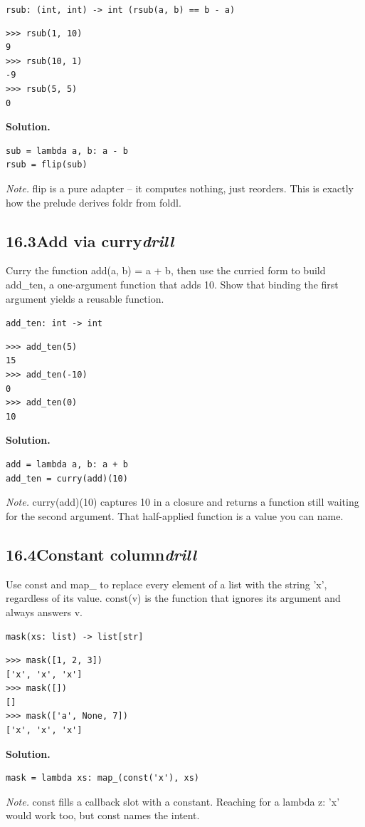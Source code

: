 \documentclass[10pt,letterpaper]{book}
\begin{document}
\noindent\texttt{rsub: (int, int) -> int   (rsub(a, b) == b - a)}
\begin{lstlisting}[style=ex]
>>> rsub(1, 10)
9
>>> rsub(10, 1)
-9
>>> rsub(5, 5)
0
\end{lstlisting}
\noindent\textbf{Solution.}
\begin{lstlisting}[style=code]
sub = lambda a, b: a - b
rsub = flip(sub)
\end{lstlisting}
\noindent\textit{Note.} flip is a pure adapter -- it computes nothing, just reorders. This is exactly how the prelude derives foldr from foldl.

\subsection*{16.3\quad Add via curry\hfill\textnormal{\textit{drill}}}
Curry the function add(a, b) = a + b, then use the curried form to build add\_ten, a one-argument function that adds 10. Show that binding the first argument yields a reusable function.

\noindent\texttt{add\_ten: int -> int}
\begin{lstlisting}[style=ex]
>>> add_ten(5)
15
>>> add_ten(-10)
0
>>> add_ten(0)
10
\end{lstlisting}
\noindent\textbf{Solution.}
\begin{lstlisting}[style=code]
add = lambda a, b: a + b
add_ten = curry(add)(10)
\end{lstlisting}
\noindent\textit{Note.} curry(add)(10) captures 10 in a closure and returns a function still waiting for the second argument. That half-applied function is a value you can name.

\subsection*{16.4\quad Constant column\hfill\textnormal{\textit{drill}}}
Use const and map\_ to replace every element of a list with the string 'x', regardless of its value. const(v) is the function that ignores its argument and always answers v.

\noindent\texttt{mask(xs: list) -> list[str]}
\begin{lstlisting}[style=ex]
>>> mask([1, 2, 3])
['x', 'x', 'x']
>>> mask([])
[]
>>> mask(['a', None, 7])
['x', 'x', 'x']
\end{lstlisting}
\noindent\textbf{Solution.}
\begin{lstlisting}[style=code]
mask = lambda xs: map_(const('x'), xs)
\end{lstlisting}
\noindent\textit{Note.} const fills a callback slot with a constant. Reaching for a lambda z: 'x' would work too, but const names the intent.
\end{document}
